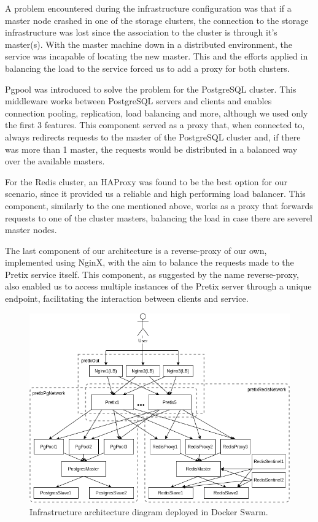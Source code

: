 \documentclass[12pt]{article}
\begin{document}
A problem encountered during the infrastructure configuration was that if a master node crashed in one of the storage clusters, the connection to the storage 
infrastructure was lost since the association to the cluster is through it's master(s).
With the master machine down in a distributed environment, the service was incapable of locating the new master. 
This and the efforts applied in balancing the load to the service forced us to add a proxy for both clusters.

Pgpool \cite{pgpool} was introduced to solve the problem for the PostgreSQL cluster. 
This middleware works between PostgreSQL servers and clients and enables connection pooling, replication, load balancing and more, although we used only the first
3 features.
This component served as a proxy that, when connected to, always redirects requests to the master of the PostgreSQL cluster and, if there was more than 1 master, 
the requests would be distributed in a balanced way over the available masters. 

For the Redis cluster, an HAProxy \cite{haproxy} was found to be the best option for our scenario, since it provided us a reliable and high performing load balancer.
This component, similarly to the one mentioned above, works as a proxy that forwards requests to one of the cluster masters, balancing the load in case there 
are severel master nodes.

The last component of our architecture is a reverse-proxy of our own, implemented using NginX, with the aim to balance the requests made to the Pretix service itself. 
This component, as suggested by the name reverse-proxy, also enabled us to access multiple instances of the Pretix server through a unique endpoint, facilitating 
the interaction between clients and service.

\begin{figure}[H]
  \centering
  \begin{minipage}{.85\textwidth}
    \centering
    \includegraphics[width=\linewidth]{diagrams/InfrastructureArchitecture.png}
  \end{minipage}%
  \caption{Infrastructure architecture diagram deployed in Docker Swarm.}
  \label{fig:InfrastructureArchitecture}
\end{figure}
\end{document}
